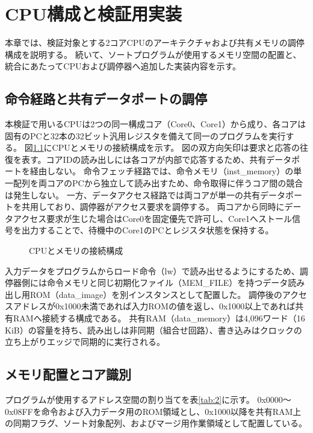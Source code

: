 \chapter{CPU構成と検証用実装}\label{chap:2}

本章では、検証対象とする2コアCPUのアーキテクチャおよび共有メモリの調停構成を説明する。
続いて、ソートプログラムが使用するメモリ空間の配置と、統合にあたってCPUおよび調停器へ追加した実装内容を示す。

\section{命令経路と共有データポートの調停}\label{sec:2-1}

本検証で用いるCPUは2つの同一構成コア（Core0、Core1）から成り、各コアは固有のPCと32本の32ビット汎用レジスタを備えて同一のプログラムを実行する。
図\ref{fig:1}にCPUとメモリの接続構成を示す。
図の双方向矢印は要求と応答の往復を表す。コアIDの読み出しには各コアが内部で応答するため、共有データポートを経由しない。
命令フェッチ経路では、命令メモリ（inst\_memory）の単一配列を両コアのPCから独立して読み出すため、命令取得に伴うコア間の競合は発生しない。
一方、データアクセス経路では両コアが単一の共有データポートを共用しており、調停器がアクセス要求を調停する。
両コアから同時にデータアクセス要求が生じた場合はCore0を固定優先で許可し、Core1へストール信号を出力することで、待機中のCore1のPCとレジスタ状態を保持する。

\begin{figure}[H]
\centering

\caption{CPUとメモリの接続構成}\label{fig:1}
\end{figure}

入力データをプログラムからロード命令（lw）で読み出せるようにするため、調停器側には命令メモリと同じ初期化ファイル（MEM\_FILE）を持つデータ読み出し用ROM（data\_image）を別インスタンスとして配置した。
調停後のアクセスアドレスが0x1000未満であれば入力ROMの値を返し、0x1000以上であれば共有RAMへ接続する構成である。
共有RAM（data\_memory）は4,096ワード（16 KiB）の容量を持ち、読み出しは非同期（組合せ回路）、書き込みはクロックの立ち上がりエッジで同期的に実行される。

\section{メモリ配置とコア識別}\label{sec:2-2}

プログラムが使用するアドレス空間の割り当てを表\ref{tab:2}に示す。
0x0000〜0x08FFを命令および入力データ用のROM領域とし、0x1000以降を共有RAM上の同期フラグ、ソート対象配列、およびマージ用作業領域として配置している。

